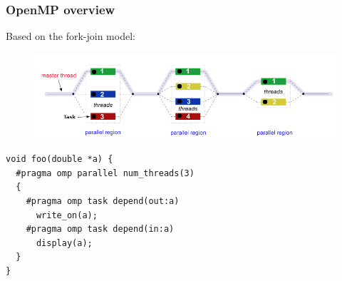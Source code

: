\documentclass[xcolor={usenames,dvipsnames,svgnames,table}, aspectratio=43]{beamer}
\begin{document}
\begin{frame}[fragile]
\frametitle{OpenMP overview}
Based on the fork-join model:

    \begin{figure}
        \includegraphics[width=\textwidth]{graph/fork_join.png}
    \end{figure}
        \begin{lstlisting}
void foo(double *a) {
  #pragma omp parallel num_threads(3)
  {
    #pragma omp task depend(out:a)
      write_on(a);
    #pragma omp task depend(in:a)
      display(a);
  }
}
        \end{lstlisting}
\end{frame}
\end{document}
